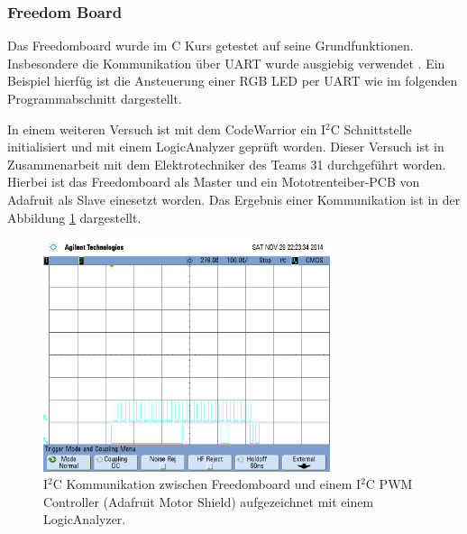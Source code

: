 \subsubsection{Freedom Board}
Das Freedomboard wurde im C Kurs getestet auf seine Grundfunktionen.
Insbesondere die Kommunikation über UART wurde ausgiebig verwendet
\cite{ninuxC}. Ein Beispiel hierfüg ist die Ansteuerung einer RGB LED
per UART wie im folgenden Programmabschnitt dargestellt.



In einem weiteren Versuch ist mit dem CodeWarrior ein I$^2$C Schnittstelle
initialisiert und mit einem LogicAnalyzer geprüft worden. Dieser Versuch ist
in Zusammenarbeit mit dem Elektrotechniker des Teams 31 durchgeführt worden.
Hierbei ist das Freedomboard als Master und ein Mototrenteiber-PCB von
Adafruit als Slave einesetzt worden. Das Ergebnis einer Kommunikation ist
in der Abbildung \ref{fig:frdm-i2c} dargestellt.

\begin{figure}[h!]
	\centering
	\includegraphics[width=0.75\textwidth]{../../fig/frdm-i2c}
	\caption{I$^2$C Kommunikation zwischen Freedomboard und einem
		I$^2$C PWM Controller (Adafruit Motor Shield)
		aufgezeichnet mit einem LogicAnalyzer.}
	\label{fig:frdm-i2c}
\end{figure}

